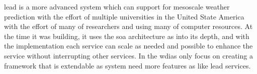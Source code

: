 \acrshort{lead} is a more advanced system which can support for mesoscale weather prediction with the effort of multiple universities in the United State America with the effort of many of researchers and using many of computer resources. At the time it was building, it uses the \acrshort{soa} architecture as into its depth, and with the implementation each service can scale as needed and possible to enhance the service without interrupting other services. In the \acrshort{wdias} only focus on creating a framework that is extendable as system need more features as like \acrshort{lead} services.
